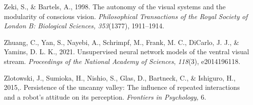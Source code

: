 \documentclass[12pt]{article}
\begin{document}
Zeki, S., \& Bartels, A., 1998. The autonomy of the visual systems and
the modularity of conscious vision. \emph{Philosophical Transactions of
the Royal Society of London B: Biological Sciences, 353}(1377),
1911--1914.

Zhuang, C., Yan, S., Nayebi, A., Schrimpf, M., Frank, M. C., DiCarlo, J.
J., \& Yamins, D. L. K., 2021. Unsupervised neural network models of the
ventral visual stream. \emph{Proceedings of the National Academy of
Sciences}, \emph{118}(3), e2014196118.

Zlotowski, J., Sumioka, H., Nishio, S., Glas, D., Bartneck, C., \&
Ishiguro, H., 2015,. Persistence of the uncanny valley: The influence of
repeated interactions and a robot's attitude on its perception.
\emph{Frontiers in Psychology,} 6.
\end{document}
